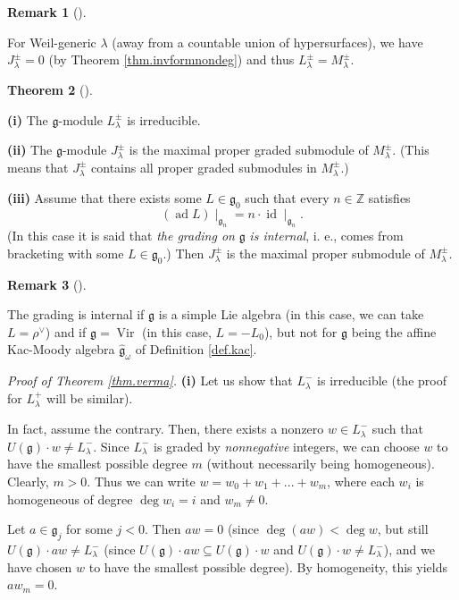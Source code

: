 \documentclass
[numbers=enddot,12pt,final,onecolumn,german,notitlepage]{scrartcl}%
\theoremstyle{definition}
\newtheorem{theo}{Theorem}
\newenvironment{theorem}[1][]
{\begin{theo}[#1]\begin{leftbar}}
{\end{leftbar}\end{theo}}
\newtheorem{remk}[theo]{Remark}
\newenvironment{remark}[1][]
{\begin{remk}[#1]\begin{leftbar}}
{\end{leftbar}\end{remk}}
\begin{document}
\begin{remark}
For Weil-generic $\lambda$ (away from a countable union of hypersurfaces), we
have $J_{\lambda}^{\pm}=0$ (by Theorem \ref{thm.invformnondeg}) and thus
$L_{\lambda}^{\pm}=M_{\lambda}^{\pm}$.
\end{remark}

\begin{theorem}
\label{thm.verma}\textbf{(i)} The $\mathfrak{g}$-module $L_{\lambda}^{\pm}$ is irreducible.

\textbf{(ii)} The $\mathfrak{g}$-module $J_{\lambda}^{\pm}$ is the maximal
proper graded submodule of $M_{\lambda}^{\pm}$. (This means that $J_{\lambda
}^{\pm}$ contains all proper graded submodules in $M_{\lambda}^{\pm}$.)

\textbf{(iii)} Assume that there exists some $L\in\mathfrak{g}_{0}$ such that
every $n\in\mathbb{Z}$ satisfies
\[
\left(  \operatorname*{ad}L\right)  \mid_{\mathfrak{g}_{n}}=n\cdot
\operatorname*{id}\mid_{\mathfrak{g}_{n}}.
\]
(In this case it is said that \textit{the grading on }$\mathfrak{g}$
\textit{is internal}, i. e., comes from bracketing with some $L\in
\mathfrak{g}_{0}$.) Then $J_{\lambda}^{\pm}$ is the maximal proper submodule
of $M_{\lambda}^{\pm}$.
\end{theorem}

\begin{remark}
The grading is internal if $\mathfrak{g}$ is a simple Lie algebra (in this
case, we can take $L=\rho^{\vee}$) and if $\mathfrak{g}=\operatorname*{Vir}$
(in this case, $L=-L_{0}$), but not for $\mathfrak{g}$ being the affine
Kac-Moody algebra $\widehat{\mathfrak{g}}_{\omega}$ of Definition
\ref{def.kac}.
\end{remark}

\textit{Proof of Theorem \ref{thm.verma}.} \textbf{(i)} Let us show that
$L_{\lambda}^{-}$ is irreducible (the proof for $L_{\lambda}^{+}$ will be similar).

In fact, assume the contrary. Then, there exists a nonzero $w\in L_{\lambda
}^{-}$ such that $U\left(  \mathfrak{g}\right)  \cdot w\neq L_{\lambda}^{-}$.
Since $L_{\lambda}^{-}$ is graded by \textit{nonnegative} integers, we can
choose $w$ to have the smallest possible degree $m$ (without necessarily being
homogeneous). Clearly, $m>0$. Thus we can write $w=w_{0}+w_{1}+...+w_{m}$,
where each $w_{i}$ is homogeneous of degree $\deg w_{i}=i$ and $w_{m}\neq0$.

Let $a\in\mathfrak{g}_{j}$ for some $j<0$. Then $aw=0$ (since $\deg\left(
aw\right)  <\deg w$, but still $U\left(  \mathfrak{g}\right)  \cdot aw\neq
L_{\lambda}^{-}$ (since $U\left(  \mathfrak{g}\right)  \cdot aw\subseteq
U\left(  \mathfrak{g}\right)  \cdot w$ and $U\left(  \mathfrak{g}\right)
\cdot w\neq L_{\lambda}^{-}$), and we have chosen $w$ to have the smallest
possible degree). By homogeneity, this yields $aw_{m}=0$.
\end{document}
